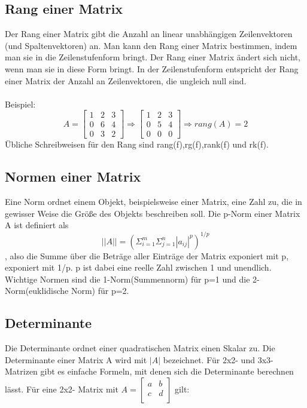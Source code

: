\documentclass[11pt]{scrreprt}
\begin{document}
\subsection{Rang einer Matrix}
Der Rang einer Matrix gibt die Anzahl an linear unabhängigen Zeilenvektoren (und Spaltenvektoren) an. Man kann den Rang einer Matrix bestimmen, indem man sie in die Zeilenstufenform bringt. Der Rang einer Matrix ändert sich nicht, wenn man sie in diese Form bringt. In der Zeilenstufenform entspricht der Rang einer Matrix der Anzahl an Zeilenvektoren, die ungleich null sind.\\
\\
Beispiel:
\begin{equation}
A = \begin{bmatrix}
1 & 2 & 3\\
0 & 6 & 4\\
0 & 3 & 2
\end{bmatrix}
\Rightarrow
\begin{bmatrix}
1 & 2 & 3\\
0 & 5 & 4\\
0 & 0 & 0
\end{bmatrix}
\Rightarrow rang(A) = 2
\end{equation}
Übliche Schreibweisen für den Rang sind rang(f),rg(f),rank(f) und rk(f).
\subsection{Normen einer Matrix}
Eine Norm ordnet einem Objekt, beispielsweise einer Matrix, eine Zahl zu, die in gewisser Weise die Größe des Objekts beschreiben soll.
Die p-Norm einer Matrix A ist definiert als
\begin{equation}
||A|| = (\Sigma_{i=1}^m \Sigma_{j=1}^n |a_{ij}|^p)^{1/p}
\end{equation}
, also die Summe über die Beträge aller Einträge der Matrix exponiert mit p,  exponiert mit 1/p. p ist dabei eine reelle Zahl zwischen 1 und unendlich. Wichtige Normen sind die 1-Norm(Summennorm) für p=1 und die 2-Norm(euklidische Norm) für p=2.
\subsection{Determinante}
Die Determinante ordnet einer quadratischen Matrix einen Skalar zu. Die Determinante einer Matrix A wird mit $|A|$ bezeichnet.
Für 2x2- und 3x3- Matrizen gibt es einfache Formeln, mit denen sich die Determinante berechnen lässt. Für eine 2x2- Matrix mit $
A =
\begin{bmatrix}
a & b \\
c & d \\
\end{bmatrix}
$ gilt:
\end{document}
